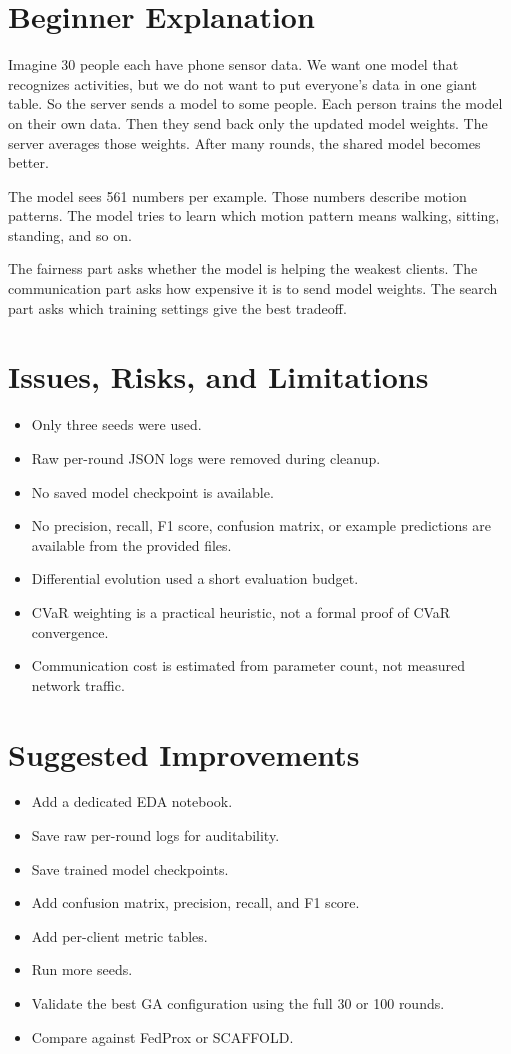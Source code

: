 \documentclass{article}
\begin{document}
\section{Beginner Explanation}
Imagine 30 people each have phone sensor data. We want one model that recognizes activities, but we do not want to put everyone's data in one giant table. So the server sends a model to some people. Each person trains the model on their own data. Then they send back only the updated model weights. The server averages those weights. After many rounds, the shared model becomes better.

The model sees 561 numbers per example. Those numbers describe motion patterns. The model tries to learn which motion pattern means walking, sitting, standing, and so on.

The fairness part asks whether the model is helping the weakest clients. The communication part asks how expensive it is to send model weights. The search part asks which training settings give the best tradeoff.

\section{Issues, Risks, and Limitations}
\begin{itemize}
  \item Only three seeds were used.
  \item Raw per-round JSON logs were removed during cleanup.
  \item No saved model checkpoint is available.
  \item No precision, recall, F1 score, confusion matrix, or example predictions are available from the provided files.
  \item Differential evolution used a short evaluation budget.
  \item CVaR weighting is a practical heuristic, not a formal proof of CVaR convergence.
  \item Communication cost is estimated from parameter count, not measured network traffic.
\end{itemize}

\section{Suggested Improvements}
\begin{itemize}
  \item Add a dedicated EDA notebook.
  \item Save raw per-round logs for auditability.
  \item Save trained model checkpoints.
  \item Add confusion matrix, precision, recall, and F1 score.
  \item Add per-client metric tables.
  \item Run more seeds.
  \item Validate the best GA configuration using the full 30 or 100 rounds.
  \item Compare against FedProx or SCAFFOLD.
\end{itemize}
\end{document}
